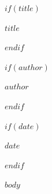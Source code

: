 \documentclass[12pt]{article}
\begin{document}
$if(title)$
\begin{center}
{\headingfont\Huge $title$}
\end{center}
$endif$

$if(author)$
{\headingfont\Large $author$\par}
$endif$

$if(date)$
{\large $date$\par}
$endif$

\vspace{1cm}

$body$
\end{document}
